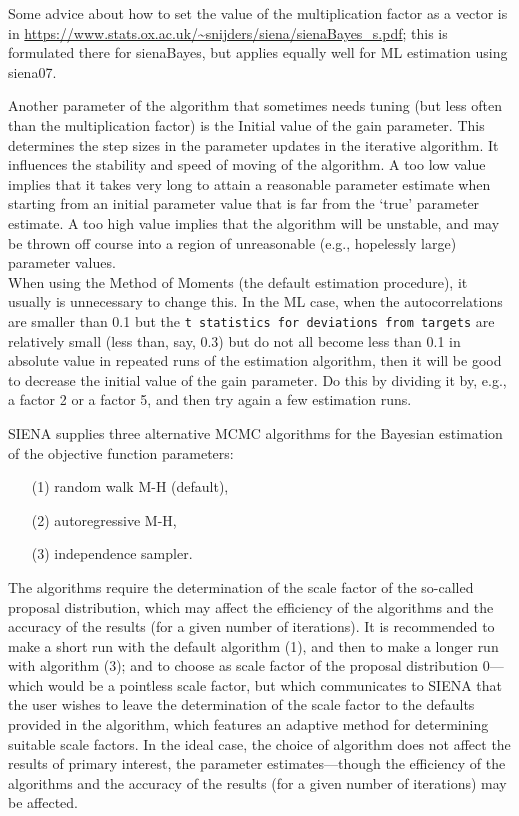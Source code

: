 \documentclass[a4paper,fleqn,11pt]{article}
\newcommand{\+}{\, + \,}
\newcommand{\sfn}[1]{\textsf{#1}}
\newcommand{\SI}{{\sf SIENA }}
\begin{document}
Some advice about how to set the value of the multiplication factor
as a vector is in
\url{https://www.stats.ox.ac.uk/~snijders/siena/sienaBayes_s.pdf};
this is formulated there for \sfn{sienaBayes}, but applies
equally well for ML estimation using \sfn{siena07}.

Another parameter of the algorithm that sometimes needs tuning
(but less often than the multiplication factor)
is the \textsf{Initial value of the gain parameter}.
This determines the step sizes in the parameter updates in the iterative
algorithm.
It influences the stability and speed of moving of the algorithm.
A too low value implies that it takes very long to attain a
reasonable parameter estimate when starting from an initial
parameter value that is far from the `true' parameter estimate.
A too high value implies that the algorithm will be unstable,
and may be thrown off course into a region of unreasonable
(e.g., hopelessly large) parameter values.\\
When using the Method of Moments
(the default estimation procedure), it usually is unnecessary to change
this. In the ML case, when the autocorrelations are smaller
than 0.1 but the \texttt{t statistics for deviations from targets}
are relatively small (less than, say, 0.3) but do not all become
less than 0.1 in absolute value in repeated runs of the
estimation algorithm, then it will be good to decrease the
\textsf{initial value of the gain parameter}. Do this by dividing
it by, e.g., a factor 2 or a factor 5, and then try again
a few estimation runs.


\iffalse
\SI supplies three alternative MCMC algorithms for the
Bayesian estimation of the objective function parameters:
\begin{itemize}
\item[(1)] random walk M-H (default),
\item[(2)] autoregressive M-H,
\item[(3)] independence sampler.
\end{itemize}
The algorithms require the determination of the scale factor of
the so-called proposal distribution, which may affect the efficiency
of the algorithms and the accuracy of the results (for a given number of iterations).
It is recommended to make a short run with the default algorithm (1),
and then to make a longer run with algorithm (3);
and to choose as scale factor of the proposal
distribution $0$---which would be a pointless scale factor,
but which communicates to \SI that the user wishes to
leave the determination of the scale factor to the defaults provided in the algorithm,
which features an adaptive method for determining suitable
scale factors.
In the ideal case, the choice of algorithm does not affect the
results of primary interest, the parameter estimates---though the
efficiency of the algorithms and the accuracy of the results (for a
given number of iterations) may be affected.
\end{document}
